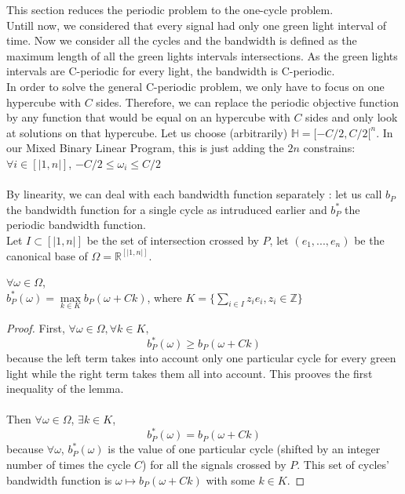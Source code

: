 This section reduces the periodic problem to the one-cycle problem.\\
Untill now, we considered that every signal had only one green light interval of time. Now we consider all the cycles and the bandwidth is defined as the maximum length of all the green lights intervals intersections. As the green lights intervals are C-periodic for every light, the bandwidth is C-periodic. \\
In order to solve the general C-periodic problem, we only have to focus on one hypercube with $C$ sides. Therefore, we can replace the periodic objective function by any function that would be equal on an hypercube with $C$ sides and only look at solutions on that hypercube. Let us choose (arbitrarily) $\mathbb{H} = [-C/2, C/2[^n$. In our Mixed Binary Linear Program, this is just adding the $2n$ constrains: $\forall i \in [|1,n|]$, $-C/2 \leq \omega_i \leq C/2$\\ \\
By linearity, we can deal with each bandwidth function separately : let us call $b_P$ the bandwidth function for a single cycle as intruduced earlier and $b^*_P$ the periodic bandwidth function. \\
Let $I \subset [|1,n|]$ be the set of intersection crossed by $P$, let $(e_1,...,e_n)$ be the canonical base of $\Omega = \mathbb{R}^{[|1,n|]}$. \\
\begin{lemma}
$\forall \omega \in \Omega$,\\
$b^*_P(\omega) = \max\limits_{k \in K} b_P(\omega + Ck)$,
where $K = \{\sum\limits_{i \in I}z_i e_i, z_i \in \mathbb{Z}\}$
\end{lemma}
\begin{proof}
First, $\forall \omega \in \Omega, \forall k \in K,$
\begin{equation}
b^*_P(\omega) \geq b_P(\omega + Ck)
\label{singleinferior}
\end{equation}
because the left term takes into account only one particular cycle for every green light while the right term takes them all into account. This prooves the first inequality of the lemma.\\ \\
Then $\forall \omega \in \Omega$, $\exists k \in K$,
\begin{equation}
b^*_P(\omega) = b_P(\omega + Ck)
\end{equation}
because $\forall \omega$, $b^*_P(\omega)$ is the value of one particular cycle (shifted by an integer number of times the cycle $C$) for all the signals crossed by $P$. This set of cycles' bandwidth function is $\omega \longmapsto b_P(\omega + Ck)$ with some $k \in K$.
\end{proof}

